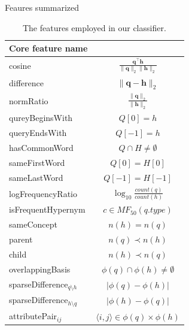 \documentclass{beamer}
\newlength{\onecolwid}
\begin{document}
\begin{frame}[t]
\begin{columns}[t]
\begin{column}{\onecolwid}
    \begin{block}{Feaures summarized}
      \begin{table}
        \begin{tabular}{lc}
          \toprule
          Core feature name   & \\
          \midrule
          {cosine}            & $\frac{\mathbf{q}^\intercal \mathbf{h}}{\lVert \mathbf{q} \rVert_2\lVert \mathbf{h} \rVert_2}$ \\ %
          {difference}        & $\lVert \mathbf{q} - \mathbf{h} \rVert_2$ \\ %
          {normRatio}         & $\frac{\lVert \mathbf{q}\rVert_2}{\lVert 
          \mathbf{h} \rVert_2}$ \\ %
          \midrule
          {qureyBeginsWith}   & $Q[0] = h$ \\ %
          {queryEndsWith}     & $Q[-1] = h$ \\
          {hasCommonWord} & $Q \cap H \neq \emptyset$ \\ %
          {sameFirstWord}        & $Q[0] = H[0]$ \\ %
          {sameLastWord}        & $Q[-1] = H[-1]$ \\
          {logFrequencyRatio} & $\log_{10}\frac{count(q)}{count(h)}$ \\ %
          {isFrequentHypernym}\footnotemark & $c \in MF_{50}(q.type)$\\
          \midrule
          sameConcept & $n(h)=n(q)$ \\
          parent  & $n(q)\prec n(h)$ \\
          child  & $n(h)\prec n(q)$ \\
          \midrule
          {overlappingBasis}  & $\phi(q) \cap \phi(h) \neq \emptyset$ \\ %
          {sparseDifference$_{q\setminus h}$} & $\lvert \phi(q) - \phi(h) \rvert$ \\ %
          {sparseDifference$_{h\setminus q}$} & $\lvert \phi(h) - \phi(q) \rvert$ \\
          attributePair$_{ij}$      & $\langle i,j\rangle\in\phi(q)\times\phi(h)$ \\ %
          \bottomrule
        \end{tabular}
        \caption{The features employed in our classifier. \\
        }
        \label{table:core_features}
      \end{table}


\end{block}
\end{column}
\end{columns}
\end{frame}
\end{document}
